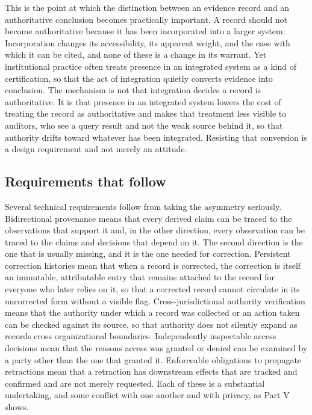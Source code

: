 \documentclass[11pt]{article}
\theoremstyle{plain}
\theoremstyle{definition}
\theoremstyle{remark}
\begin{document}
This is the point at which the distinction between an evidence record and an authoritative conclusion becomes practically important. A record should not become authoritative because it has been incorporated into a larger system. Incorporation changes its accessibility, its apparent weight, and the ease with which it can be cited, and none of these is a change in its warrant. Yet institutional practice often treats presence in an integrated system as a kind of certification, so that the act of integration quietly converts evidence into conclusion. The mechanism is not that integration decides a record is authoritative. It is that presence in an integrated system lowers the cost of treating the record as authoritative and makes that treatment less visible to auditors, who see a query result and not the weak source behind it, so that authority drifts toward whatever has been integrated. Resisting that conversion is a design requirement and not merely an attitude.

\subsection{Requirements that follow}

Several technical requirements follow from taking the asymmetry seriously. Bidirectional provenance means that every derived claim can be traced to the observations that support it and, in the other direction, every observation can be traced to the claims and decisions that depend on it. The second direction is the one that is usually missing, and it is the one needed for correction. Persistent correction histories mean that when a record is corrected, the correction is itself an immutable, attributable entry that remains attached to the record for everyone who later relies on it, so that a corrected record cannot circulate in its uncorrected form without a visible flag. Cross-jurisdictional authority verification means that the authority under which a record was collected or an action taken can be checked against its source, so that authority does not silently expand as records cross organizational boundaries. Independently inspectable access decisions mean that the reasons access was granted or denied can be examined by a party other than the one that granted it. Enforceable obligations to propagate retractions mean that a retraction has downstream effects that are tracked and confirmed and are not merely requested. Each of these is a substantial undertaking, and some conflict with one another and with privacy, as Part V shows.
\end{document}
